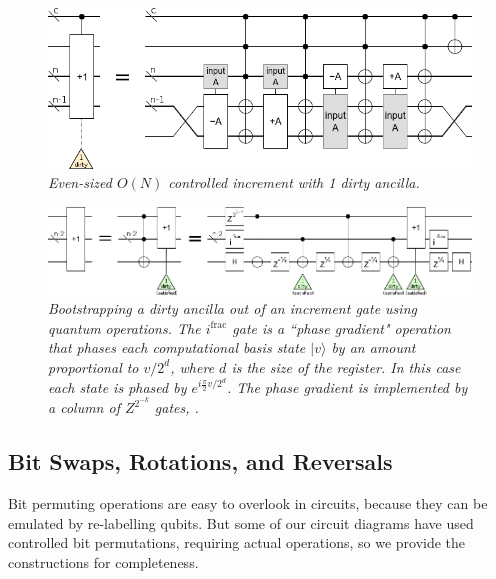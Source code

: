 \documentclass[twocolumn]{article}
\begin{document}
\begin{figure}
  \centering
  \includegraphics[width=\linewidth]{assets/controlled-increment-even.png}
  \caption{\em Even-sized $O(N)$ controlled increment with 1 dirty ancilla.}
  \label{fig:controlled-increment-even}
\end{figure}

\begin{figure}
  \centering
  \includegraphics[width=\linewidth]{assets/ancilla-bootstrap.png}
  \caption{\em Bootstrapping a dirty ancilla out of an increment gate using quantum operations.
  The $i^{\text{frac}}$ gate is a ``phase gradient" operation that phases each computational basis state $|v\rangle$ by an amount proportional to $v/2^d$, where $d$ is the size of the register.
  In this case each state is phased by $e^{i \frac{\pi}{2} v/2^d}$.
  The phase gradient is implemented by a column of $Z^{2^{-k}}$ gates, .}
  \label{fig:bootstrap-ancilla}
\end{figure}


\subsection{Bit Swaps, Rotations, and Reversals}

Bit permuting operations are easy to overlook in circuits, because they can be emulated by re-labelling qubits.
But some of our circuit diagrams have used controlled bit permutations, requiring actual operations, so we provide the constructions for completeness.
\end{document}
